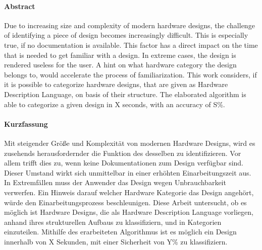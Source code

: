 
\paragraph{Abstract}
Due to increasing size and complexity of modern hardware designs, the challenge
of identifying a piece of design becomes increasingly difficult. This is especially
true, if no documentation is available. This factor has a direct impact on the 
time that is needed to get familiar with a design. In extreme cases, the design
is rendered useless for the user. A hint on what hardware category the design 
belongs to, would accelerate the process of familiarization.
This work considers, if it is possible to categorize hardware designs, that are
given as Hardware Description Language, on basis of their structure. 
The elaborated algorithm is able to categorize a given design in X seconds, with
an accuracy of S\%.

\paragraph{Kurzfassung}
Mit steigender Größe und Komplexität von modernen Hardware Designs, wird es 
zusehends herausfordernder die Funktion des desselben zu identifizieren. Vor
allem trifft dies zu, wenn keine Dokumentationen zum Design verfügbar sind. Dieser 
Umstand wirkt sich unmittelbar in einer erhöhten Einarbeitungszeit aus. In Extremfällen 
muss der Anwender das Design wegen Unbrauchbarkeit verwerfen. Ein Hinweis darauf welcher
Hardware Kategorie das Design angehört, würde den Einarbeitungsprozess beschleunigen.
Diese Arbeit untersucht, ob es möglich ist Hardware Designs, die als Hardware
Description Language vorliegen, anhand ihres strukturellen Aufbaus zu klassifiziern, 
und in Kategorien einzuteilen. 
Mithilfe des erarbeiteten Algorithmus ist es möglich ein Design innerhalb von X 
Sekunden, mit einer Sicherheit von Y\% zu klassifiziern. 
